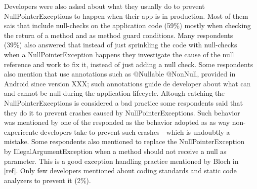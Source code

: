 Developers were also asked about what they usually do to prevent NullPointerExceptions to happen when their app is in production. Most of them sais that include null-checks on the application code (59\%) mostly when checking the return of a method and as method guard conditions. Many respondents (39\%) also answered that instead of just sprinkling the code with null-checks when a NullPointerException happens they investigate the cause of the null reference and work to fix it, instead of just adding a null check. Some respondents also mention that use annotations such as @Nullable @NonNull, provided in Android since version XXX; such annotations guide de developer about what can and cannot be null during the application lifecycle. Altough catching the NullPointerExceptions is considered a bad practice some respondents said that they do it to prevent crashes caused by NullPointerExceptions. Such behavior was mentioned by one of the responded as the behavior adopted as as way non-expericente developers take to prevent such crashes - which is undoubtly a mistake. Some respondents also mentioned to replace the NullPointerException by IllegalArgumentException when a method should not receive a null as parameter. This is a good exception handling practice mentioned by Bloch in [ref]. Only few developers mentioned about coding standards and static code analyzers to prevent it (2\%).






